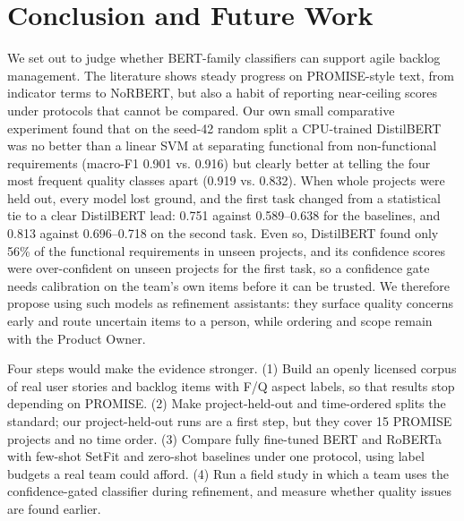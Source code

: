 \documentclass[conference,10pt,letterpaper]{IEEEtran}
\begin{document}
\section{Conclusion and Future Work}\label{sec:concl}
We set out to judge whether BERT-family classifiers can support agile backlog management. The literature shows steady progress on PROMISE-style text, from indicator terms to NoRBERT, but also a habit of reporting near-ceiling scores under protocols that cannot be compared. Our own small comparative experiment found that on the seed-42 random split a CPU-trained DistilBERT was no better than a linear SVM at separating functional from non-functional requirements (macro-F1 0.901 vs. 0.916) but clearly better at telling the four most frequent quality classes apart (0.919 vs. 0.832). When whole projects were held out, every model lost ground, and the first task changed from a statistical tie to a clear DistilBERT lead: 0.751 against 0.589–0.638 for the baselines, and 0.813 against 0.696–0.718 on the second task. Even so, DistilBERT found only 56\% of the functional requirements in unseen projects, and its confidence scores were over-confident on unseen projects for the first task, so a confidence gate needs calibration on the team's own items before it can be trusted. We therefore propose using such models as refinement assistants: they surface quality concerns early and route uncertain items to a person, while ordering and scope remain with the Product Owner.

Four steps would make the evidence stronger. (1) Build an openly licensed corpus of real user stories and backlog items with F/Q aspect labels, so that results stop depending on PROMISE. (2) Make project-held-out and time-ordered splits the standard; our project-held-out runs are a first step, but they cover 15 PROMISE projects and no time order. (3) Compare fully fine-tuned BERT and RoBERTa with few-shot SetFit and zero-shot baselines under one protocol, using label budgets a real team could afford. (4) Run a field study in which a team uses the confidence-gated classifier during refinement, and measure whether quality issues are found earlier.

\printbibliography[title={References}]
\end{document}
